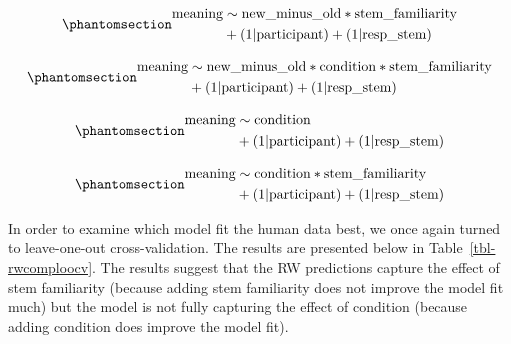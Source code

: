 \documentclass[
  letterpaper,
  DIV=11,
  numbers=noendperiod]{scrartcl}
\begin{document}
\begin{equation}\phantomsection\label{eq-rwcomp3}{
\begin{aligned}
\text{meaning} & \sim \text{new\_minus\_old} * \text{stem\_familiarity} \\ 
& +  (1 | \text{participant}) + (1|\text{resp\_stem})
\end{aligned}
}\end{equation}

\begin{equation}\phantomsection\label{eq-rwcomp4}{
\begin{aligned}
\text{meaning} & \sim \text{new\_minus\_old} * \text{condition} * \text{stem\_familiarity} \\ 
& +  (1 | \text{participant}) + (1|\text{resp\_stem})
\end{aligned}
}\end{equation}

\begin{equation}\phantomsection\label{eq-rwcomp5}{
\begin{aligned}
\text{meaning} & \sim \text{condition} \\ 
& +  (1 | \text{participant}) + (1|\text{resp\_stem})
\end{aligned}
}\end{equation}

\begin{equation}\phantomsection\label{eq-rwcomp6}{
\begin{aligned}
\text{meaning} & \sim \text{condition} * \text{stem\_familiarity} \\ 
& +  (1 | \text{participant}) + (1|\text{resp\_stem})
\end{aligned}
}\end{equation}

In order to examine which model fit the human data best, we once again
turned to leave-one-out cross-validation. The results are presented
below in Table~\ref{tbl-rwcomploocv}. The results suggest that the RW
predictions capture the effect of stem familiarity (because adding stem
familiarity does not improve the model fit much) but the model is not
fully capturing the effect of condition (because adding condition does
improve the model fit).
\end{document}
